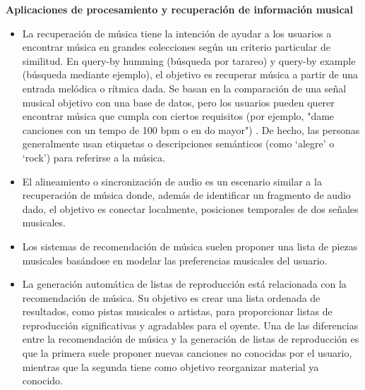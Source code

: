\textbf{Aplicaciones de procesamiento y recuperación de información musical}
\begin{itemize}
    \item La recuperación de música tiene la intención de ayudar a los usuarios a encontrar música en grandes colecciones según un criterio particular de similitud. En query-by humming (búsqueda por tarareo) y query-by example (búsqueda mediante ejemplo), el objetivo es recuperar música a partir de una entrada melódica o rítmica dada. Se basan en la comparación de una señal musical objetivo con una base de datos, pero los usuarios pueden querer encontrar música que cumpla con ciertos requisitos (por ejemplo, "dame canciones con un tempo de 100 bpm o en do mayor") \cite{Schedl2014MusicIR}. De hecho, las personas generalmente usan etiquetas o descripciones semánticos (como `alegre'  o `rock') para referirse a la música. 
    \item El alineamiento o sincronización de audio es un escenario similar a la recuperación de música donde, además de identificar un fragmento de audio dado, el objetivo es conectar localmente, posiciones temporales de dos señales musicales.
    \item Los sistemas de recomendación de música suelen proponer una lista de piezas musicales basándose en modelar las preferencias musicales del usuario.
    \item La generación automática de listas de reproducción está relacionada con la recomendación de música. Su objetivo es crear una lista ordenada de resultados, como pistas musicales o artistas, para proporcionar listas de reproducción significativas y agradables para el oyente. Una de las diferencias entre la recomendación de música y la generación de listas de reproducción es que la primera suele proponer nuevas canciones no conocidas por el usuario, mientras que la segunda tiene como objetivo reorganizar material ya conocido.
\end{itemize}


